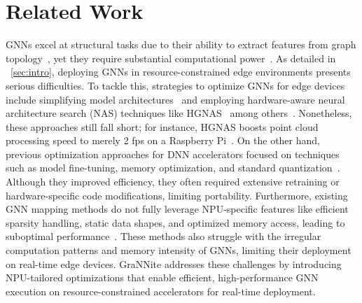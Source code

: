 \section{Related Work}\label{sec:prior_art}
GNNs excel at structural tasks due to their ability to extract features from graph topology~\cite{gnn_survey_wu}, yet they require substantial computational power~\cite{g_cos}. As detailed in \sectionautorefname~\ref{sec:intro}, deploying GNNs in resource-constrained edge environments presents serious difficulties. To tackle this, strategies to optimize GNNs for edge devices include simplifying model architectures~\cite{gcn_point_cloud} and employing hardware-aware neural architecture search (NAS) techniques like HGNAS~\cite{gnn_fpga} among others~\cite{gnn_edge_1}. Nonetheless, these approaches still fall short; for instance, HGNAS boosts point cloud processing speed to merely 2 fps on a Raspberry Pi~\cite{gnn_fpga}.
On the other hand, previous optimization approaches for DNN accelerators focused on techniques such as model fine-tuning, memory optimization, and standard quantization~\cite{fast_gnn, hls_gnn, sharedGNN}. Although they improved efficiency, they often required extensive retraining or hardware-specific code modifications, limiting portability.
Furthermore, existing GNN mapping methods do not fully leverage NPU-specific features like efficient sparsity handling, static data shapes, and optimized memory access, leading to suboptimal performance~\cite{EnGN}. These methods also struggle with the irregular computation patterns and memory intensity of GNNs, limiting their deployment on real-time edge devices.
GraNNite addresses these challenges by introducing NPU-tailored optimizations that enable efficient, high-performance GNN execution on resource-constrained accelerators for real-time deployment.

